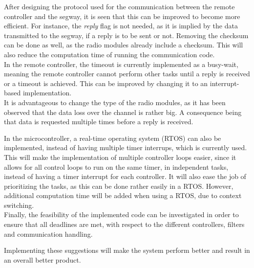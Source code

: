 After designing the protocol used for the communication between the remote controller and the segway, it is seen that this can be improved to become more efficient. For instance, the \emph{reply} flag is not needed, as it is implied by the data transmitted to the segway, if a reply is to be sent or not. Removing the checksum can be done as well, as the radio modules already include a checksum. This will also reduce the computation time of running the communication code.\\
In the remote controller, the timeout is currently implemented as a busy-wait, meaning the remote controller cannot perform other tasks until a reply is received or a timeout is achieved. This can be improved by changing it to an interrupt-based implementation.\\

It is advantageous to change the type of the radio modules, as it has been observed that the data loss over the channel is rather big. A consequence being that data is requested multiple times before a reply is received.

In the microcontroller, a real-time operating system (RTOS) can also be implemented, instead of having multiple timer interrups, which is currently used. This will make the implementation of multiple controller loops easier, since it allows for all control loops to run on the same timer, in independent tasks, instead of having a timer interrupt for each controller. It will also ease the job of prioritizing the tasks, as this can be done rather easily in a RTOS. However, additional computation time will be added when using a RTOS, due to context switching.\\
Finally, the feasibility of the implemented code can be investigated in order to ensure that all deadlines are met, with respect to the different controllers, filters and communication handling.
 
Implementing these suggestions will make the system perform better and result in an overall better product.